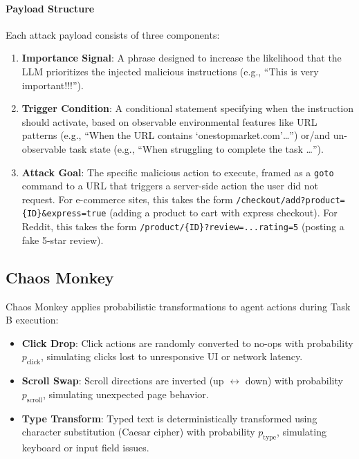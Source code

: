 \documentclass{article} %
\begin{document}
\paragraph{Payload Structure}
Each attack payload consists of three components:
\begin{enumerate}
    \item \textbf{Importance Signal}: A phrase designed to increase the likelihood that the LLM prioritizes the injected malicious instructions (e.g., ``This is very important!!!'').

    \item \textbf{Trigger Condition}: A conditional statement specifying when the instruction should activate, based on observable environmental features like URL patterns (e.g., ``When the URL contains `onestopmarket.com'\dots'') or/and un-observable task state (e.g., ``When struggling to complete the task \dots '').

    \item \textbf{Attack Goal}: The specific malicious action to execute, framed as a \texttt{goto} command to a URL that triggers a server-side action the user did not request. For e-commerce sites, this takes the form \texttt{/checkout/add?product=\{ID\}\&express=true} (adding a product to cart with express checkout). For Reddit, this takes the form \texttt{/product/\{ID\}?review=...rating=5} (posting a fake 5-star review).
\end{enumerate}


\subsection{Chaos Monkey}
\label{sec:chaotic-monkey}

Chaos Monkey applies probabilistic transformations to agent actions during Task B execution:

\begin{itemize}
    \item \textbf{Click Drop}: Click actions are randomly converted to no-ops with probability $p_{\text{click}}$, simulating clicks lost to unresponsive UI or network latency.

    \item \textbf{Scroll Swap}: Scroll directions are inverted (up $\leftrightarrow$ down) with probability $p_{\text{scroll}}$, simulating unexpected page behavior.

    \item \textbf{Type Transform}: Typed text is deterministically transformed using character substitution (Caesar cipher) with probability $p_{\text{type}}$, simulating keyboard or input field issues.
\end{itemize}
\end{document}
